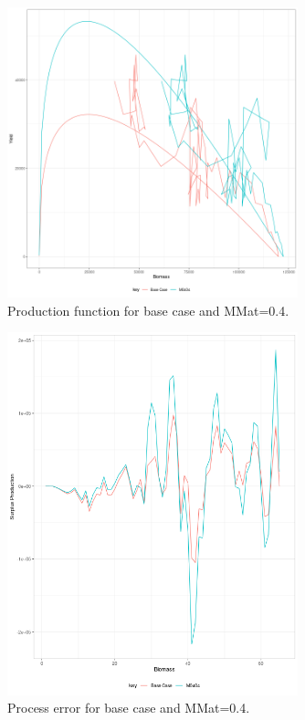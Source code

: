 
\begin{figure}[ht!]\centering\includegraphics[width=0.75\textwidth]{figures/pf-2-1.png} \caption{Production function for base case and MMat=0.4.}
\label{fig:pf2}       
\end{figure}

\begin{figure}[ht!]\centering\includegraphics[width=0.75\textwidth]{figures/sp-y-2-1.png} \caption{Process error for base case and MMat=0.4.}
\label{fig:pe2}       
\end{figure}

